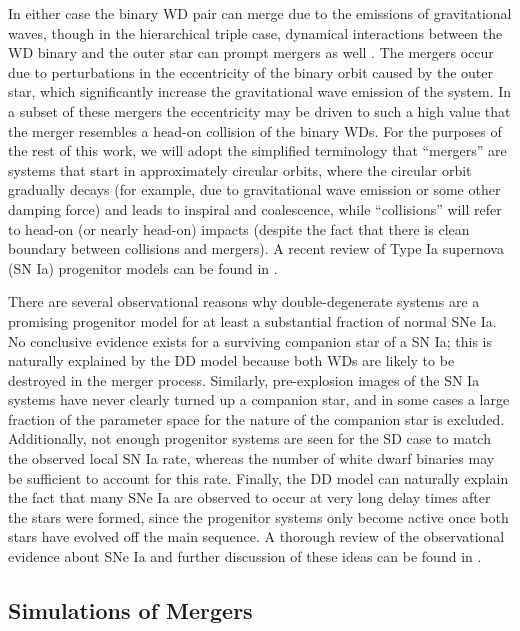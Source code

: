 \documentclass[12pt]{article}
\begin{document}
In either case the binary WD pair can merge due to the emissions of gravitational waves,
though in the hierarchical triple case, dynamical interactions between the WD binary and
the outer star can prompt mergers as well \citep{thompson:2011,hamers:2013}. The mergers
occur due to perturbations in the eccentricity of the binary orbit caused by the outer
star, which significantly increase the gravitational wave emission of the system. In a
subset of these mergers the eccentricity may be driven to such a high value that the
merger resembles a head-on collision of the binary WDs. For the purposes of the
rest of this work, we will adopt the simplified terminology that  ``mergers'' are
systems that start in approximately circular orbits, where the circular orbit
gradually decays (for example, due to gravitational wave emission or some other
damping force) and leads to inspiral and coalescence, while ``collisions'' will
refer to head-on (or nearly head-on) impacts (despite the fact that there is
clean boundary between collisions and mergers). A recent review of Type Ia
supernova (SN Ia) progenitor models can be found in \citet{hillebrandt:2013}.

There are several observational reasons why double-degenerate systems
are a promising progenitor model for at least a substantial fraction
of normal SNe Ia. No conclusive evidence exists for a surviving
companion star of a SN Ia; this is naturally explained by the DD model
because both WDs are likely to be destroyed in the merger
process. Similarly, pre-explosion images of the SN Ia systems have
never clearly turned up a companion star, and in some cases a large
fraction of the parameter space for the nature of the companion star
is excluded. Additionally, not enough progenitor systems are seen for
the SD case to match the observed local SN Ia rate, whereas the number
of white dwarf binaries may be sufficient to account for this
rate. Finally, the DD model can naturally explain the fact that many
SNe Ia are observed to occur at very long delay times after the stars
were formed, since the progenitor systems only become active once both
stars have evolved off the main sequence. A thorough review of the
observational evidence about SNe Ia and further discussion of these
ideas can be found in \cite{maoz:2014}.

\subsection{Simulations of Mergers}
\label{sec:merger_simulations}
\end{document}
